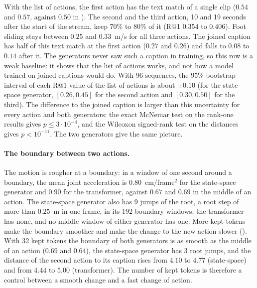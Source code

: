 With the list of actions, the first action has the text match of a single clip ($0.54$ and $0.57$, against $0.50$ in ). The second and the third action, 10 and 19 seconds after the start of the stream, keep $70\%$ to $80\%$ of it (R@1 $0.354$ to $0.406$). Foot sliding stays between $0.25$ and $0.33$~m/s for all three actions. The joined caption has half of this text match at the first action ($0.27$ and $0.26$) and falls to $0.08$ to $0.14$ after it. The generators never saw such a caption in training, so this row is a weak baseline: it shows that the list of actions works, and not how a model trained on joined captions would do. With 96 sequences, the $95\%$ bootstrap interval of each R@1 value of the list of actions is about $\pm 0.10$ (for the state-space generator, $[0.26, 0.45]$ for the second action and $[0.30, 0.50]$ for the third). The difference to the joined caption is larger than this uncertainty for every action and both generators: the exact McNemar test on the rank-one results gives $p \le 3 \cdot 10^{-4}$, and the Wilcoxon signed-rank test on the distances gives $p < 10^{-11}$. The two generators give the same picture.

\paragraph{The boundary between two actions.} The motion is rougher at a boundary: in a window of one second around a boundary, the mean joint acceleration is $0.80$~cm/frame$^2$ for the state-space generator and $0.90$ for the transformer, against $0.67$ and $0.69$ in the middle of an action. The state-space generator also has 9 jumps of the root, a root step of more than $0.25$~m in one frame, in its 192 boundary windows; the transformer has none, and no middle window of either generator has one. More kept tokens make the boundary smoother and make the change to the new action slower (). With 32 kept tokens the boundary of both generators is as smooth as the middle of an action ($0.69$ and $0.64$), the state-space generator has 3 root jumps, and the distance of the second action to its caption rises from $4.10$ to $4.77$ (state-space) and from $4.44$ to $5.00$ (transformer). The number of kept tokens is therefore a control between a smooth change and a fast change of action.

